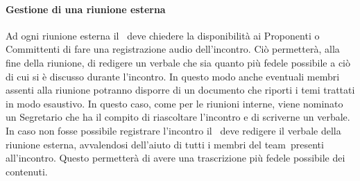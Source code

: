 \documentclass[../NormeProgetto.tex]{subfiles}
\begin{document}
				\paragraph{Gestione di una riunione esterna}
					Ad ogni riunione esterna il \responsabilediprogetto\ deve chiedere la disponibilità ai Proponenti o Committenti di fare una registrazione audio dell'incontro. Ciò permetterà, alla fine della riunione, di redigere un verbale che sia quanto più fedele possibile a ciò di cui si è discusso durante l'incontro. In questo modo anche eventuali membri assenti alla riunione potranno disporre di un documento che riporti i temi trattati in modo esaustivo. In questo caso, come per le riunioni interne, viene nominato un Segretario che ha il compito di riascoltare l'incontro e di scriverne un verbale. In caso non fosse possibile registrare l'incontro il \responsabilediprogetto\ deve redigere il verbale della riunione esterna, avvalendosi dell'aiuto di tutti i membri del team\g\ presenti all'incontro. Questo permetterà di avere una trascrizione più fedele possibile dei contenuti.
\end{document}

